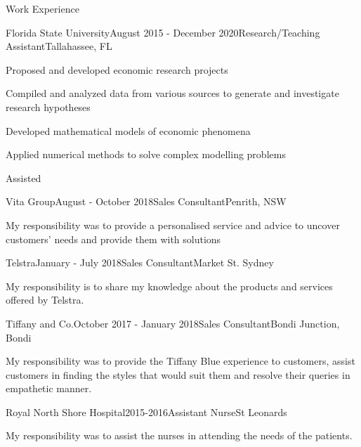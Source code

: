 \documentclass{resume} %
\begin{document}
\begin{rSection}{Work Experience}

\begin{rSubsection}{Florida State University}{August 2015 - December 2020}{Research/Teaching Assistant}{Tallahassee, FL}
\item Proposed and developed economic research projects  
\item Compiled and analyzed data from various sources to generate and investigate research hypotheses
\item Developed mathematical models of economic phenomena
\item Applied numerical methods to solve complex modelling problems
\item Assisted

\end{rSubsection}


\begin{rSubsection}{Vita Group}{August - October 2018}{Sales Consultant}{Penrith, NSW}
\item My responsibility was to provide a personalised service and advice to uncover customers' needs and provide them with solutions
\end{rSubsection}


\begin{rSubsection}{Telstra}{January - July 2018}{Sales Consultant}{Market St. Sydney}
\item My responsibility is to share my knowledge about the products and services  offered by Telstra. 
\end{rSubsection}

\begin{rSubsection}{Tiffany and Co.}{October 2017 - January 2018}{Sales Consultant}{Bondi Junction, Bondi}
\item My responsibility was to provide the Tiffany Blue experience to customers, assist customers in finding the styles that would suit them and resolve their queries in empathetic manner.

\end{rSubsection}

\begin{rSubsection}{Royal North Shore Hospital}{2015-2016}{Assistant Nurse}{St Leonards}
\item My responsibility was to assist the nurses in attending the needs of the patients. 

\end{rSubsection}
\end{rSection}
\end{document}
